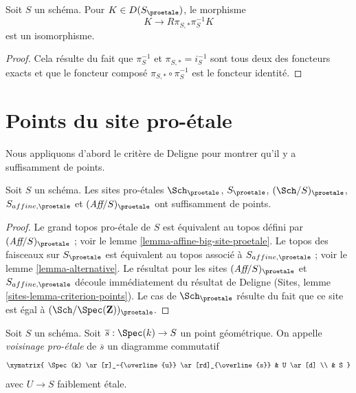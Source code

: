 \begin{lemma}
\label{lemma-cohomological-descent-proetale}
Soit $S$ un schéma. Pour $K \in D(S_\proetale)$, le morphisme
$$
K \longrightarrow R\pi_{S, *}\pi_S^{-1}K
$$
est un isomorphisme.
\end{lemma}

\begin{proof}
Cela résulte du fait que $\pi_S^{-1}$ et $\pi_{S, *} = i_S^{-1}$ sont tous deux
des foncteurs exacts et que le foncteur composé $\pi_{S, *} \circ \pi_S^{-1}$
est le foncteur identité.
\end{proof}






















\section{Points du site pro-\'etale}
\label{section-points}

\noindent
Nous appliquons d'abord le critère de Deligne pour montrer qu'il y a suffisamment de points.

\begin{lemma}
\label{lemma-points-proetale}
Soit $S$ un schéma. Les sites pro-\'etales $\Sch_\proetale$,
$S_\proetale$, $(\Sch/S)_\proetale$, $S_{affine, \proetale}$ et
$(\textit{Aff}/S)_\proetale$ ont suffisamment de points.
\end{lemma}

\begin{proof}
Le grand topos pro-\'etale de $S$ est équivalent au topos défini par
$(\textit{Aff}/S)_\proetale$ ; voir le
lemme \ref{lemma-affine-big-site-proetale}.
Le topos des faisceaux sur $S_\proetale$ est équivalent au topos
associé à $S_{affine, \proetale}$ ; voir le
lemme \ref{lemma-alternative}.
Le résultat pour les sites $(\textit{Aff}/S)_\proetale$ et
$S_{affine, \proetale}$ découle immédiatement du résultat de Deligne
(Sites, lemme \ref{sites-lemma-criterion-points}).
Le cas de $\Sch_\proetale$ résulte du fait que ce site est égal à
$(\Sch/\Spec(\mathbf{Z}))_\proetale$.
\end{proof}

\noindent
Soit $S$ un schéma. Soit $\overline{s} : \Spec(k) \to S$ un point
géométrique. On appelle {\it voisinage pro-\'etale} de $\overline{s}$ un
diagramme commutatif
$$
\xymatrix{
\Spec(k) \ar[r]_-{\overline{u}} \ar[rd]_{\overline{s}} & U \ar[d] \\
& S
}
$$
avec $U \to S$ faiblement \'etale.

